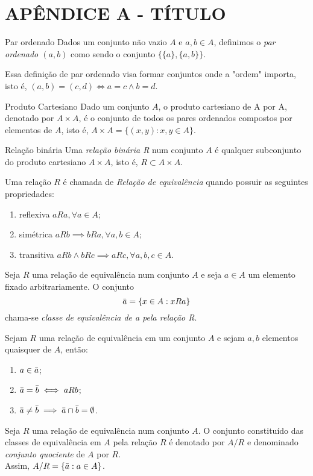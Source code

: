 \documentclass[../main.tex]{subfiles}
\begin{document}
\chapter*[Apêndice]{APÊNDICE A - TÍTULO}
\begin{defi}{Par ordenado}\label{def-par-ord}
     Dados um conjunto não vazio $A$ e $a,b \in A$, definimos o \emph{par ordenado $(a,b)$} como sendo o conjunto $\{\{a\}, \{a,b\}\}$.
\end{defi}
\begin{obs}
    Essa definição de par ordenado visa formar conjuntos onde a "ordem" importa, isto é, $(a , b) = (c , d) \iff a=c \land b=d$.
\end{obs}
\begin{defi}{Produto Cartesiano}\label{def-prod-cart}
     Dado um conjunto $A$, o produto cartesiano de A por A, denotado por $A \times A$, é o conjunto de todos os pares ordenados compostos por elementos de $A$, isto é, $A \times A = \{ (x,y) : x,y \in A \}$.
\end{defi}
\begin{defi}{Relação binária}
    Uma \emph{relação binária R} num conjunto $A$ é qualquer subconjunto do produto cartesiano $A \times A$, isto é, $R \subset A \times A$.
\end{defi}
\begin{defi}
    Uma relação $R$ é chamada de \emph{Relação de equivalência} quando possuir as seguintes propriedades:
    \begin{enumerate}[label=(\roman*)]
        \item reflexiva $aRa, \forall a \in A$;
        \item simétrica $aRb \implies bRa, \forall a,b \in A$;
        \item transitiva $aRb \land bRc \implies aRc, \forall a,b,c \in A$.
    \end{enumerate}
\end{defi}
\begin{defi}
    Seja $R$ uma relação de equivalência num conjunto $A$ e seja $a \in A$ um elemento fixado arbitrariamente. O conjunto \\
    $$\Bar{a} = \{x \in A : xRa\}$$
    chama-se \emph{classe de equivalência de a pela relação R}.
\end{defi}
\begin{teo}
    Sejam $R$ uma relação de equivalência em um conjunto $A$ e sejam $a,b$ elementos quaisquer de $A$, então:
    \begin{enumerate}
        \item $a \in \Bar{a}$;
        \item $\Bar{a} = \Bar{b} \iff aRb$;
        \item $\Bar{a} \neq \Bar{b} \implies \Bar{a} \cap \Bar{b} = \emptyset $.
    \end{enumerate}
\end{teo}
\begin{defi}
    Seja $R$ uma relação de equivalência num conjunto $A$. O conjunto constituído das classes de equivalência em $A$ pela relação $R$ é denotado por $A / R$ e denominado \emph{conjunto quociente} de $A$ por $R$. \\
    Assim, $A / R = \{\Bar{a} : a \in A\}$.
\end{defi}
\end{document}
